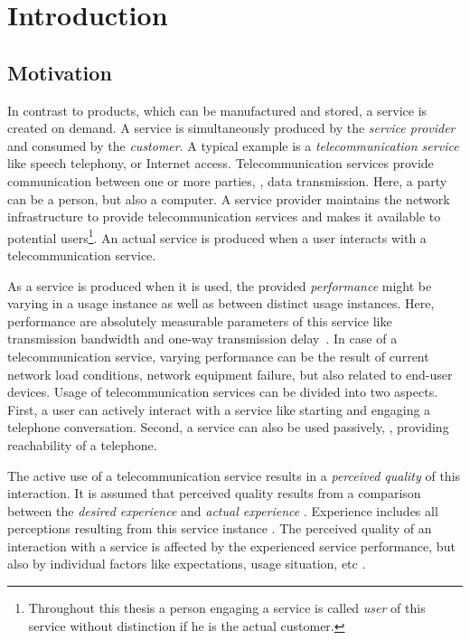 \chapter{Introduction}\label{chap:01}

\section{Motivation}
In contrast to products, which can be manufactured and stored, a service is created on demand.
A service is simultaneously produced by the \emph{service provider} and consumed by the \emph{customer}.
A typical example is a \emph{telecommunication service} like speech telephony, or Internet access.
Telecommunication services provide communication between one or more parties, \ie, data transmission.
Here, a party can be a person, but also a computer.
A service provider maintains the network infrastructure to provide telecommunication services and makes it available to potential users\footnote{Throughout this thesis a person engaging a service is called \emph{user} of this service without distinction if he is the actual customer.}.
An actual service is produced when a user interacts with a telecommunication service.

As a service is produced when it is used, the provided \emph{performance} might be varying in a usage instance as well as between distinct usage instances.
Here, performance are absolutely measurable parameters of this service like transmission bandwidth and one-way transmission delay~\citep[][p. 12]{moller_assessment_2000}.
In case of a telecommunication service, varying performance can be the result of current network load conditions, network equipment failure, but also related to end-user devices.
Usage of telecommunication services can be divided into two aspects.
First, a user can actively interact with a service like starting and engaging a telephone conversation.
Second, a service can also be used passively, \eg, providing reachability of a telephone.

The active use of a telecommunication service results in a \emph{perceived quality} of this interaction.
It is assumed that perceived quality results from a comparison between the \emph{desired experience} and \emph{actual experience} \citep[][p.~13]{raake_quality_2014}. %
Experience includes all perceptions resulting from this service instance \citep[][p.~13]{raake_quality_2014}.
The perceived quality of an interaction with a service is affected by the experienced service performance, but also by individual factors like expectations, usage situation, etc \citep[\eg,][p.~55ff.]{reiter_quality_2014}.

